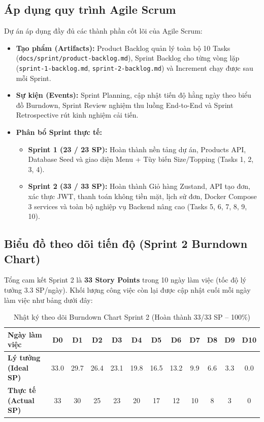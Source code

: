 \documentclass[a4paper,12pt]{article}
\begin{document}
\subsection{Áp dụng quy trình Agile Scrum}
Dự án áp dụng đầy đủ các thành phần cốt lõi của Agile Scrum:
\begin{itemize}
  \item \textbf{Tạo phẩm (Artifacts):} Product Backlog quản lý toàn bộ 10 Tasks (\texttt{docs/sprint/product-backlog.md}), Sprint Backlog cho từng vòng lặp (\texttt{sprint-1-backlog.md}, \texttt{sprint-2-backlog.md}) và Increment chạy được sau mỗi Sprint.
  \item \textbf{Sự kiện (Events):} Sprint Planning, cập nhật tiến độ hằng ngày theo biểu đồ Burndown, Sprint Review nghiệm thu luồng End-to-End và Sprint Retrospective rút kinh nghiệm cải tiến.
  \item \textbf{Phân bổ Sprint thực tế:}
    \begin{itemize}
      \item \textbf{Sprint 1 (23 / 23 SP):} Hoàn thành nền tảng dự án, Products API, Database Seed và giao diện Menu + Tùy biến Size/Topping (Tasks 1, 2, 3, 4).
      \item \textbf{Sprint 2 (33 / 33 SP):} Hoàn thành Giỏ hàng Zustand, API tạo đơn, xác thực JWT, thanh toán không tiền mặt, lịch sử đơn, Docker Compose 3 services và toàn bộ nghiệp vụ Backend nâng cao (Tasks 5, 6, 7, 8, 9, 10).
    \end{itemize}
\end{itemize}

\subsection{Biểu đồ theo dõi tiến độ (Sprint 2 Burndown Chart)}
Tổng cam kết Sprint 2 là \textbf{33 Story Points} trong 10 ngày làm việc (tốc độ lý tưởng $3.3$ SP/ngày). Khối lượng công việc còn lại được cập nhật cuối mỗi ngày làm việc như bảng dưới đây:

\begin{table}[h!]
\centering
\scriptsize
\begin{tabular}{|l|c|c|c|c|c|c|c|c|c|c|c|}
\hline
\textbf{Ngày làm việc} & \textbf{D0} & \textbf{D1} & \textbf{D2} & \textbf{D3} & \textbf{D4} & \textbf{D5} & \textbf{D6} & \textbf{D7} & \textbf{D8} & \textbf{D9} & \textbf{D10} \\
\hline
\textbf{Lý tưởng (Ideal SP)} & 33.0 & 29.7 & 26.4 & 23.1 & 19.8 & 16.5 & 13.2 & 9.9 & 6.6 & 3.3 & 0.0 \\
\hline
\textbf{Thực tế (Actual SP)} & 33 & 30 & 25 & 23 & 20 & 17 & 12 & 10 & 8 & 3 & 0 \\
\hline
\end{tabular}
\caption{Nhật ký theo dõi Burndown Chart Sprint 2 (Hoàn thành 33/33 SP -- 100\%)}
\end{table}
\end{document}
